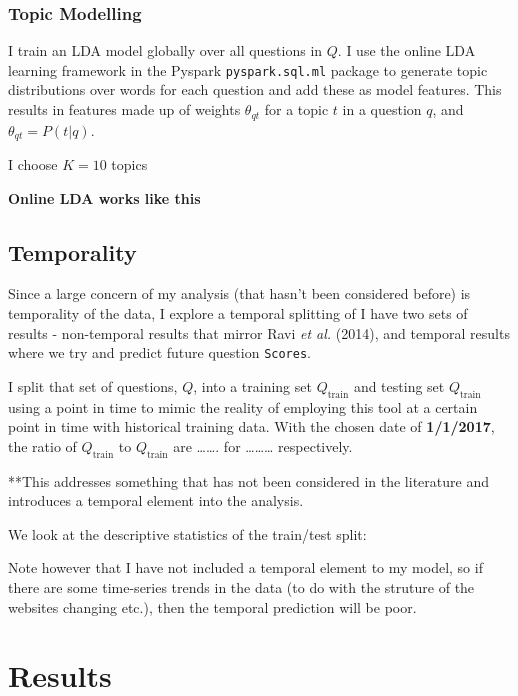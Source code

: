\documentclass[11pt,preprint, authoryear]{article}
\numberwithin{equation}{section}
\begin{document}
\subsubsection{Topic Modelling}\label{topic-modelling}

I train an LDA model globally over all questions in \(Q\). I use the
online LDA learning framework in the Pyspark \texttt{pyspark.sql.ml}
package to generate topic distributions over words for each question and
add these as model features. This results in features made up of weights
\(\theta_{qt}\) for a topic \(t\) in a question \(q\), and
\(\theta_{qt}=P(t|q).\)

I choose \(K=10\) topics

\textbf{Online LDA works like this}

\subsection{Temporality}\label{temporality-1}

Since a large concern of my analysis (that hasn't been considered
before) is temporality of the data, I explore a temporal splitting of I
have two sets of results - non-temporal results that mirror Ravi
\emph{et al.} (2014), and temporal results where we try and predict
future question \texttt{Scores}.

I split that set of questions, \(Q\), into a training set
\(Q_\text{train}\) and testing set \(Q_\text{train}\) using a point in
time to mimic the reality of employing this tool at a certain point in
time with historical training data. With the chosen date of
\textbf{1/1/2017}, the ratio of \(Q_\text{train}\) to \(Q_\text{train}\)
are \ldots{}\ldots{}. for \ldots{}\ldots{}\ldots{} respectively.

**This addresses something that has not been considered in the
literature and introduces a temporal element into the analysis.

We look at the descriptive statistics of the train/test split:

Note however that I have not included a temporal element to my model, so
if there are some time-series trends in the data (to do with the
struture of the websites changing etc.), then the temporal prediction
will be poor.

\section{\texorpdfstring{Results
\label{Results}}{Results }}\label{results}
\end{document}

